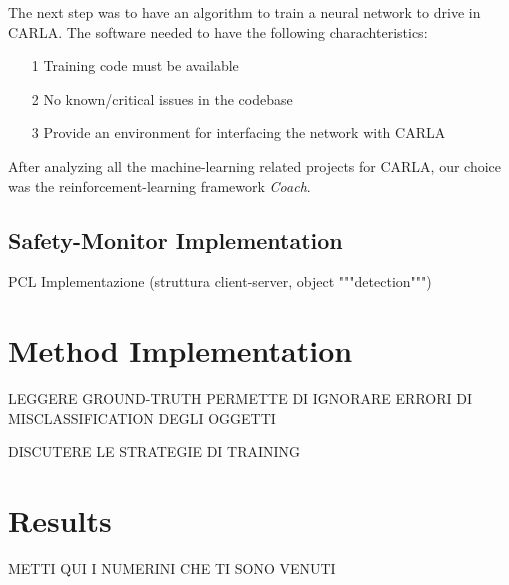 The next step was to have an algorithm to train a neural network to drive in CARLA. The software needed to have the following charachteristics:

\begin{itemize}
	\item[1] Training code must be available
	\item[2] No known/critical issues in the codebase
	\item[3] Provide an environment for interfacing the network with CARLA
\end{itemize}

After analyzing all the machine-learning related projects for CARLA, our choice was the reinforcement-learning framework \textsl{Coach}.\cite{coach}

\subsection{Safety-Monitor Implementation}

PCL
Implementazione (struttura client-server, object """detection""")

\section{Method Implementation}


LEGGERE GROUND-TRUTH PERMETTE DI IGNORARE ERRORI DI MISCLASSIFICATION DEGLI OGGETTI

DISCUTERE LE STRATEGIE DI TRAINING

\section{Results}

METTI QUI I NUMERINI CHE TI SONO VENUTI